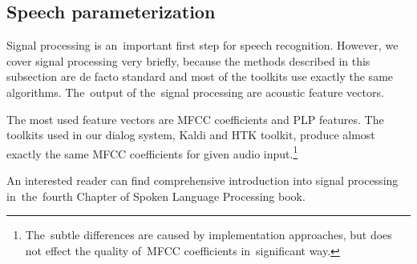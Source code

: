 % 
% 


\subsection{Speech parameterization}
\label{sub:param}
Signal processing is an~important first step for speech recognition. However, we cover signal processing very briefly, 
because the methods described in this subsection are de facto standard and most of the toolkits use exactly the same 
algorithms. The~output of the~signal processing are acoustic feature vectors. 


The most used feature vectors are \ac{MFCC} coefficients and \ac{PLP} features. The toolkits used in our dialog system, 
Kaldi and \ac{HTK} toolkit, produce almost exactly the same \ac{MFCC} coefficients for given audio 
input.\footnote{The~subtle differences are caused by implementation approaches, but does not effect the quality 
    of~\ac{MFCC} coefficients in~significant way.}

An interested reader can find comprehensive introduction into signal processing 
in~the~fourth Chapter of Spoken Language Processing book\cite{huang2001spoken}.


